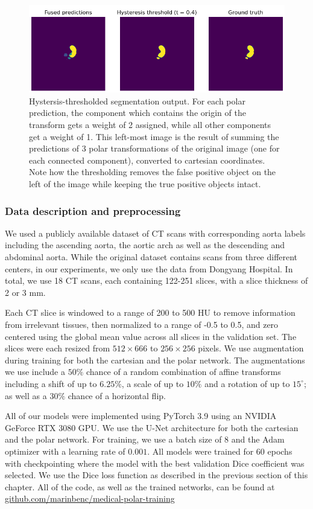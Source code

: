 \begin{figure}[h]
\centering
\includegraphics[width=0.8\columnwidth]{images/4/hyst}
\caption{Hystersis-thresholded segmentation output. For each polar prediction, the component which contains the origin of the transform gets a weight of 2 assigned, while all other components get a weight of 1. This left-most image is the result of summing the predictions of 3 polar transformations of the original image (one for each connected component), converted to cartesian coordinates. Note how the thresholding removes the false positive object on the left of the image while keeping the true positive objects intact.}
\label{fig:thresh}
\end{figure}

\subsubsection{Data description and preprocessing}

We used a publicly available dataset of CT scans with corresponding aorta labels \cite{radlAVTMulticenterAortic2022} including the ascending aorta, the aortic arch as well as the descending and abdominal aorta. While the original dataset contains scans from three different centers, in our experiments, we only use the data from Dongyang Hospital. In total, we use 18 CT scans, each containing 122-251 slices, with a slice thickness of 2 or 3 mm.

Each CT slice is windowed to a range of 200 to 500 HU to remove information from irrelevant tissues, then normalized to a range of -0.5 to 0.5, and zero centered using the global mean value across all slices in the validation set. The slices were each resized from $512 \times 666$ to $256 \times 256$ pixels. We use augmentation during training for both the cartesian and the polar network. The augmentations we use include a $50\%$ chance of a random combination of affine transforms including a shift of up to $6.25\%$, a scale of up to $10\%$ and a rotation of up to $15^{\circ}$; as well as a $30\%$ chance of a horizontal flip.

All of our models were implemented using PyTorch 3.9 using an NVIDIA GeForce RTX 3080 GPU. We use the U-Net \cite{ronnebergerUNetConvolutionalNetworks2015d} architecture for both the cartesian and the polar network. For training, we use a batch size of 8 and the Adam optimizer with a learning rate of $0.001$. All models were trained for 60 epochs with checkpointing where the model with the best validation Dice coefficient was selected. We use the Dice loss function as described in the previous section of this chapter. All of the code, as well as the trained networks, can be found at \href{https://github.com/marinbenc/medical-polar-training}{github.com/marinbenc/medical-polar-training}

